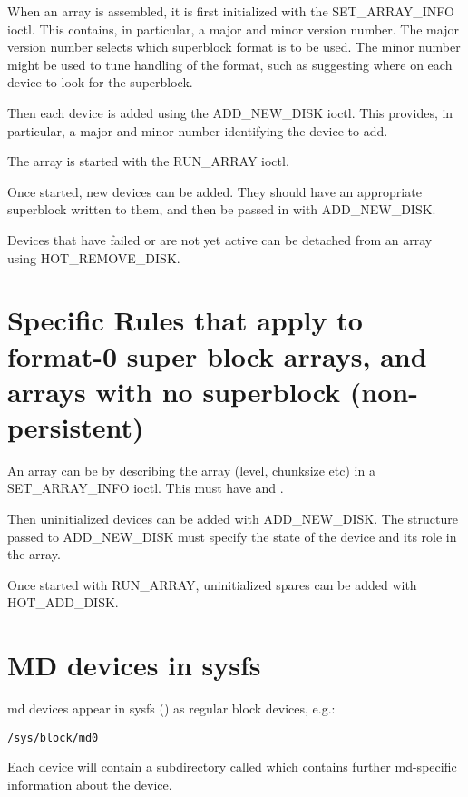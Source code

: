 \documentclass[a4paper,8pt,english]{sphinxmanual}
\begin{document}
When an array is assembled, it is first initialized with the
SET\_ARRAY\_INFO ioctl.  This contains, in particular, a major and minor
version number.  The major version number selects which superblock
format is to be used.  The minor number might be used to tune handling
of the format, such as suggesting where on each device to look for the
superblock.

Then each device is added using the ADD\_NEW\_DISK ioctl.  This
provides, in particular, a major and minor number identifying the
device to add.

The array is started with the RUN\_ARRAY ioctl.

Once started, new devices can be added.  They should have an
appropriate superblock written to them, and then be passed in with
ADD\_NEW\_DISK.

Devices that have failed or are not yet active can be detached from an
array using HOT\_REMOVE\_DISK.


\section{Specific Rules that apply to format-0 super block arrays, and arrays with no superblock (non-persistent)}
\label{admin-guide/md:specific-rules-that-apply-to-format-0-super-block-arrays-and-arrays-with-no-superblock-non-persistent}
An array can be  by describing the array (level, chunksize
etc) in a SET\_ARRAY\_INFO ioctl.  This must have  and
.

Then uninitialized devices can be added with ADD\_NEW\_DISK.  The
structure passed to ADD\_NEW\_DISK must specify the state of the device
and its role in the array.

Once started with RUN\_ARRAY, uninitialized spares can be added with
HOT\_ADD\_DISK.


\section{MD devices in sysfs}
\label{admin-guide/md:md-devices-in-sysfs}
md devices appear in sysfs () as regular block devices,
e.g.:

\begin{Verbatim}[commandchars=\\\{\}]
/sys/block/md0
\end{Verbatim}

Each  device will contain a subdirectory called  which
contains further md-specific information about the device.
\end{document}
